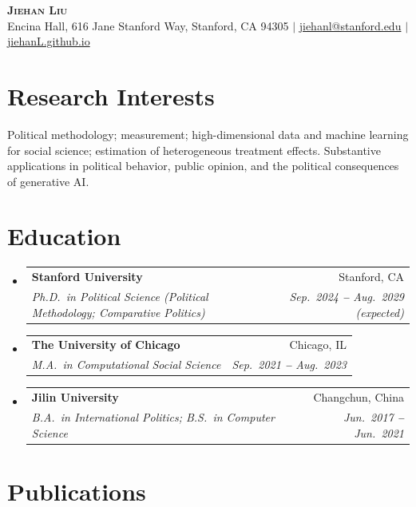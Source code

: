 \documentclass[letterpaper,10.5pt]{article}
\makeatletter
\newcommand{\resumeEducationHeading}[4]{
  \vspace{-2pt}\item
    \begin{tabular*}{0.97\textwidth}[t]{l@{\extracolsep{\fill}}r}
      \textbf{#1} & #2 \\
      \textit{\small#3} & \textit{\small #4} \\
    \end{tabular*}\vspace{2pt}
}
\newcommand{\resumeSubHeadingListStart}{\begin{itemize}[leftmargin=0.15in, label={}]}
\newcommand{\resumeSubHeadingListEnd}{\end{itemize}}
\makeatother
\begin{document}

\begin{center}
    \textbf{\Huge \scshape Jiehan Liu} \\ \vspace{3pt}
    \small
    Encina Hall, 616 Jane Stanford Way, Stanford, CA 94305
    $|$
    \hspace{.5pt} \href{mailto:jiehanl@stanford.edu}{jiehanl@stanford.edu}
    $|$
    \hspace{.5pt} \href{https://jiehanL.github.io}{jiehanL.github.io}
\end{center}



\section{Research Interests}
  \vspace{1pt}
  \small Political methodology; measurement; high-dimensional data and machine learning for social science; estimation of heterogeneous treatment effects. Substantive applications in political behavior, public opinion, and the political consequences of generative AI.



\section{Education}
  \vspace{1pt}
  \resumeSubHeadingListStart

    \resumeEducationHeading
      {Stanford University}{Stanford, CA}
      {Ph.D.\ in Political Science (Political Methodology; Comparative Politics)}{Sep.\ 2024 \textbf{--} Aug.\ 2029 (expected)}

    \resumeEducationHeading
      {The University of Chicago}{Chicago, IL}
      {M.A.\ in Computational Social Science}{Sep.\ 2021 \textbf{--} Aug.\ 2023}

    \resumeEducationHeading
      {Jilin University}{Changchun, China}
      {B.A.\ in International Politics; B.S.\ in Computer Science}{Jun.\ 2017 \textbf{--} Jun.\ 2021}

  \resumeSubHeadingListEnd



\section{Publications}
  \vspace{2pt}
\end{document}
